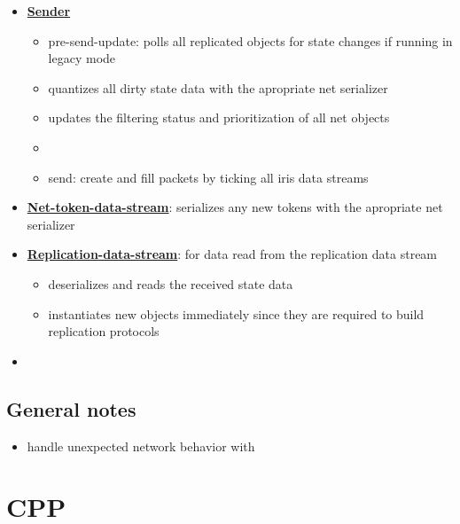             \begin{itemize}
                \item \textbf{\uline{Sender}}
                \begin{itemize}
                    \item pre-send-update: polls all replicated objects for state changes if running in legacy mode
                    \item quantizes all dirty state data with the apropriate net serializer
                    \item updates the filtering status and prioritization of all net objects
                    \item 
                    \item send: create and fill packets by ticking all iris data streams
                \end{itemize}
                \item \textbf{\uline{Net-token-data-stream}}: serializes any new tokens with the apropriate net serializer
                \item \textbf{\uline{Replication-data-stream}}: for data read from the replication data stream
                \begin{itemize}
                    \item deserializes and reads the received state data
                    \item instantiates new objects immediately since they are required to build replication protocols
                \end{itemize}
                \item 
            \end{itemize}
            


        \subsection{General notes}
            \begin{itemize}
                \item handle unexpected network behavior with 
                
            \end{itemize}


    \section{CPP}
